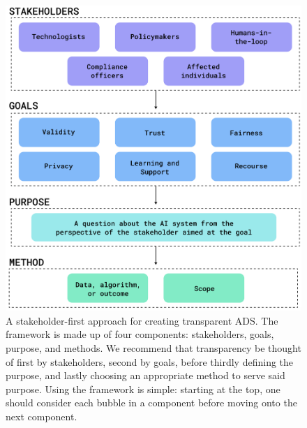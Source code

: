 \begin{figure}[t!]
\begin{center}
\includegraphics[width=1.0\linewidth]{figs/figure1.png}
\end{center}
\caption{A stakeholder-first approach for creating transparent ADS. The framework is made up of four components: stakeholders, goals, purpose, and methods. We recommend that transparency be thought of first by stakeholders, second by goals, before thirdly defining the purpose, and lastly choosing an appropriate method to serve said purpose. Using the framework is simple: starting at the top, one should consider each bubble in a component before moving onto the next component.}
\label{fig:taxonomy}
\end{figure}

